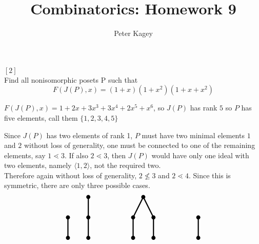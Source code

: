 \documentclass{article}
\newenvironment{problem}[2][Problem]{\begin{trivlist}
\item[\hskip \labelsep {\bfseries #1}\hskip \labelsep {\bfseries #2.}]}{\end{trivlist}}
\newenvironment{solution}[1][Solution.]{\begin{trivlist}
\item[\hskip \labelsep {\bfseries #1}]}{\end{trivlist}}
\begin{document}
\title{Combinatorics: Homework 9}
\author{Peter Kagey}

\maketitle

\begin{problem}{34} $[2]$ \\
  Find all nonisomorphic posets P such that \[
    F(J(P), x) = (1 + x)(1 + x^2)(1 + x + x^2)
  \]
\end{problem}

\begin{solution}
  $F(J(P), x) = 1 + 2x + 3x^3 + 3x^4 + 2x^5 + x^6$, so $J(P)$ has rank $5$ so
  $P$ has five elements, call them $\{1,2,3,4,5\}$

  Since $J(P)$ has two elements of rank 1, $P$ must have two minimal elements
  $1$ and $2$ without loss of generality, one must be connected to one of the
  remaining elements, say $1 \lessdot 3$. If also $2 \lessdot 3$, then $J(P)$
  would have only one ideal with two elements, namely $\langle 1, 2 \rangle$, not
  the required two.
  \\
  Therefore again without loss of generality, $2 \not\leq 3$ and $2 \lessdot 4$.
  Since this is symmetric, there are only three possible cases.
  \[
    \begin{tikzpicture}
      \fill (0,0) circle (0.1);
      \fill (0,1) circle (0.1);
      \draw[ultra thick] (0,0)--(0,1);

      \fill (1,0) circle (0.1);
      \fill (1,1) circle (0.1);
      \fill (1,2) circle (0.1);
      \draw[ultra thick] (1,0)--(1,2);
    \end{tikzpicture}
    \hspace{2cm}
    \begin{tikzpicture}
      \fill (0,0) circle (0.1);
      \fill (0,1) circle (0.1);
      \draw[ultra thick] (0,0)--(0,1);

      \fill (1,0) circle (0.1);
      \fill (1,1) circle (0.1);
      \draw[ultra thick] (1,0)--(1,1);

      \fill (1/2,2) circle (0.1);
      \draw[ultra thick] (1,1)--(1/2,2)--(0,1);
    \end{tikzpicture}
    \hspace{2cm}
    \begin{tikzpicture}
      \fill (0,0) circle (0.1);
      \fill (0,1) circle (0.1);
      \draw[ultra thick] (0,0)--(0,1);


\end{tikzpicture}\]
\end{solution}
\end{document}
